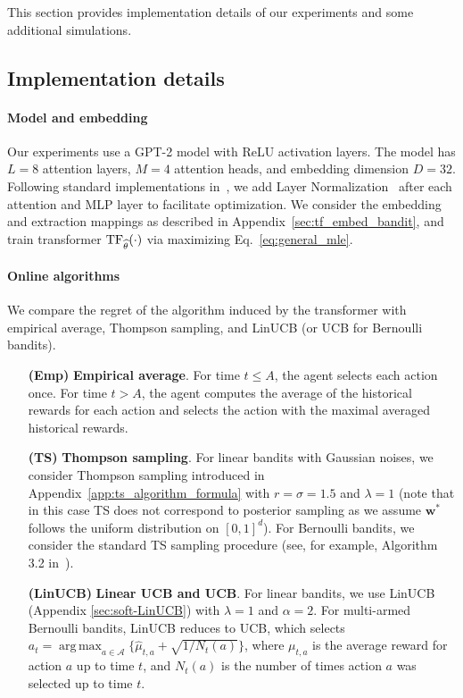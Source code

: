 \documentclass[10pt]{article}
\renewcommand{\hat}{\widehat}
\DeclareMathOperator*{\argmax}{arg\,max}
\newcommand{\<}{\left\langle}
\renewcommand{\>}{\right\rangle}
\newcommand{\TF}{{\rm TF}}
\newcommand{\Tpsparn}{{r}} %
\newcommand{\action}{{a}}
\newcommand{\EstPar}{{\widehat{\theta}}}
\newcommand{\actionsp}{{\mathcal{A}}}
\newcommand{\Numvi}{{N}}
\def\bw{{\mathbf w}}
\newcommand{\authnote}[2]{{\scriptsize $\ll$\textsf{#1 notes: #2}$\gg$}}
\newcommand{\authnote}[2]{}
\newcommand{\lc}[1]{{\color{blue}\authnote{Licong}{#1}}}
\begin{document}

This section provides implementation details of our experiments and some additional simulations.

\subsection{Implementation details}
\paragraph{Model and embedding}

Our experiments use a GPT-2 model \citep{radford2019language} with ReLU activation layers. The model has $L=8$ attention layers, $M=4$ attention heads, and embedding dimension $D=32$. Following standard implementations in~\cite{vaswani2017attention}, we add Layer Normalization~\citep{ba2016layer} after each attention and MLP layer to facilitate optimization. We consider the embedding and extraction mappings as described in Appendix~\ref{sec:tf_embed_bandit}, and train transformer $\TF_{\EstPar}(\cdot)$ via  maximizing Eq.~\eqref{eq:general_mle}.
\paragraph{Online algorithms}
We compare the regret of the algorithm induced by the transformer with empirical average, Thompson sampling, and LinUCB (or UCB for Bernoulli bandits).
\begin{itemize}
\item[\textbf{(Emp)}]\textbf{Empirical average}. 
For time $t\leq A$, the agent selects each action once. For time $t>A$, the agent computes the average of the historical rewards for each action and selects the action with the maximal
averaged historical rewards.
\item[\textbf{(TS)}]\textbf{Thompson sampling}. For linear bandits with Gaussian noises, we consider Thompson sampling introduced in Appendix~\ref{app:ts_algorithm_formula} with $\Tpsparn=\sigma=1.5$ and $\lambda=1$ (note that in this case TS does not correspond to posterior sampling as we assume $\bw^*$ follows the uniform distribution on $[0,1]^d$). For Bernoulli bandits,  we consider the standard TS sampling procedure (see, for example, Algorithm 3.2 in~\cite{russo2018tutorial}). 
\item[\textbf{(LinUCB)}]\textbf{Linear UCB and UCB}. For linear bandits, we use LinUCB (Appendix \ref{sec:soft-LinUCB}) with $\lambda=1$ and $\alpha=2$. For multi-armed Bernoulli bandits, LinUCB reduces to UCB, which selects $\action_t=\argmax_{\action\in\actionsp}\{\hat \mu_{t,\action}+\sqrt{1/\Numvi_t(\action)}\}$, where $\mu_{t,\action}$ is the average reward for action $\action$ up to time $t$, and $\Numvi_t(\action)$ is the number of times action $\action$ was selected up to time $t$.
\end{itemize} 
\end{document}
